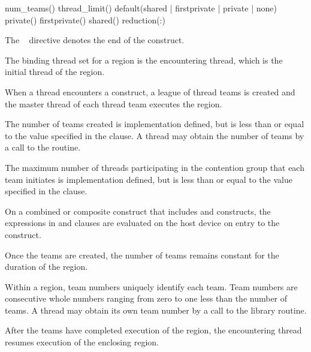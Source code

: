 {{{{\begin{indentedcodelist}
num\_teams()
thread\_limit()
default(shared \textnormal{|} firstprivate \textnormal{|} private \textnormal{|} none)
private()
firstprivate()
shared()
reduction(:)
\end{indentedcodelist}

The ~ directive denotes the end of the  construct.
\fortranspecificend

\begin{samepage}

\binding
The binding thread set for a  region is the encountering thread,
which is the initial thread of the  region.

\descr
When a thread encounters a  construct, a league of thread teams is created and 
the master thread of each thread team executes the  region.

The number of teams created is implementation defined, but is less than or equal to the 
value specified in the  clause.
A thread may obtain the number of teams by a call to the  routine.

\end{samepage}

The maximum number of threads participating in the contention group that each team 
initiates is implementation defined, but is less than or equal to the value specified in the 
 clause.

On a combined or composite construct that includes  and
 constructs, the expressions in  and
 clauses are evaluated on the host device on
entry to the  construct.

Once the teams are created, the number of teams remains constant for the duration of the 
 region.

Within a  region, team numbers uniquely identify each team. Team numbers are 
consecutive whole numbers ranging from zero to one less than the number of teams. A 
thread may obtain its own team number by a call to the  library 
routine.

After the teams have completed execution of the  region, the encountering thread 
resumes execution of the enclosing  region.

}}}}
